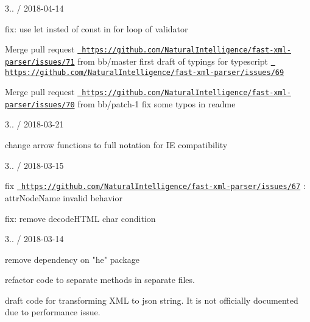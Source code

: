 3.. / 2018-\/04-\/14
\begin{DoxyItemize}
\item fix\+: use let insted of const in for loop of validator
\item Merge pull request \href{https://github.com/NaturalIntelligence/fast-xml-parser/issues/71}{\texttt{ https\+://github.\+com/\+Natural\+Intelligence/fast-\/xml-\/parser/issues/71}} from bb/master first draft of typings for typescript \href{https://github.com/NaturalIntelligence/fast-xml-parser/issues/69}{\texttt{ https\+://github.\+com/\+Natural\+Intelligence/fast-\/xml-\/parser/issues/69}}
\item Merge pull request \href{https://github.com/NaturalIntelligence/fast-xml-parser/issues/70}{\texttt{ https\+://github.\+com/\+Natural\+Intelligence/fast-\/xml-\/parser/issues/70}} from bb/patch-\/1 fix some typos in readme
\end{DoxyItemize}

3.. / 2018-\/03-\/21
\begin{DoxyItemize}
\item change arrow functions to full notation for IE compatibility
\end{DoxyItemize}

3.. / 2018-\/03-\/15
\begin{DoxyItemize}
\item fix \href{https://github.com/NaturalIntelligence/fast-xml-parser/issues/67}{\texttt{ https\+://github.\+com/\+Natural\+Intelligence/fast-\/xml-\/parser/issues/67}} \+: attr\+Node\+Name invalid behavior
\item fix\+: remove decode\+HTML char condition
\end{DoxyItemize}

3.. / 2018-\/03-\/14
\begin{DoxyItemize}
\item remove dependency on "{}he"{} package
\item refactor code to separate methods in separate files.
\item draft code for transforming XML to json string. It is not officially documented due to performance issue.
\end{DoxyItemize}


